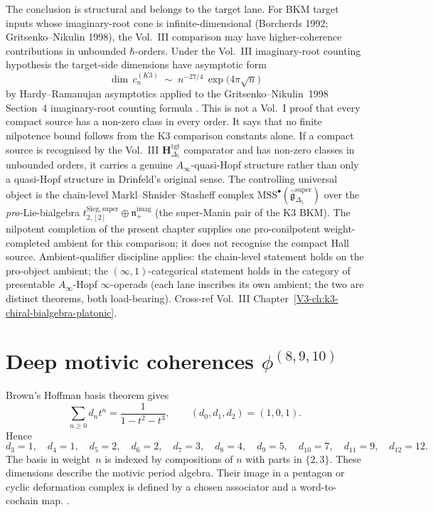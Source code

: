 \begin{remark}
\label{rem:nc-Ainfty-open}
The conclusion is structural and belongs to the target lane.  For BKM
target inputs whose imaginary-root cone is infinite-dimensional
\textup{(}Borcherds 1992; Gritsenko--Nikulin 1998\textup{)}, the
Vol.~III comparison may have higher-coherence contributions in
unbounded $\hbar$-orders.  Under the Vol.~III imaginary-root counting
hypothesis the target-side dimensions have asymptotic form
\[
\dim\,c_n^{(K3)} \;\sim\; n^{-27/4}\,\exp\!\bigl(4\pi\sqrt{n}\bigr)
\]
by Hardy--Ramanujan asymptotics applied to the Gritsenko--Nikulin~1998
Section~4 imaginary-root counting formula
\cite{GritsenkoNikulin1998,Borcherds1992,HardyRamanujan1918}.
This is not a Vol.~I proof that every compact source has a non-zero
class in every order.  It says that no finite nilpotence bound follows
from the K3 comparison constants alone.  If a compact source is
recognised by the Vol.~III
$\mathbf H_{\Delta_5}^{\mathrm{tgt}}$ comparator and has non-zero
classes in unbounded orders, it carries a genuine
$A_\infty$-quasi-Hopf structure rather than only a quasi-Hopf structure
in Drinfeld's original sense.  The
controlling universal object is the chain-level Markl--Shnider--Stasheff
complex $\mathrm{MSS}^\bullet(\widehat{\mathfrak g}^{\mathrm{super}}_{\Delta_5})$
over the \emph{pro-}Lie-bialgebra
$t^{\mathrm{Sieg},\mathrm{super}}_{2,[2]} \oplus \mathfrak n_+^{\mathrm{imag}}$
(the super-Manin pair of the K3 BKM).  The nilpotent completion of the
present chapter supplies one pro-conilpotent weight-completed ambient
for this comparison; it does not recognise the compact Hall source.
Ambient-qualifier
discipline applies: the chain-level statement holds on the
pro-object ambient; the $(\infty,1)$-categorical statement holds in
the category of presentable $A_\infty$-Hopf $\infty$-operads
(each lane inscribes its own ambient; the two are distinct
theorems, both load-bearing). Cross-ref Vol.~III
Chapter~\ref{V3-ch:k3-chiral-bialgebra-platonic}.
\end{remark}

\section{Deep motivic coherences $\phi^{(8,9,10)}$}
\label{sec:nc-supplement-iii}

\begin{remark}
\label{rem:nc-brown-deligne}
Brown's Hoffman basis theorem gives
\[
 \sum_{n\geq0}d_nt^n=\frac{1}{1-t^2-t^3},
 \qquad
 (d_0,d_1,d_2)=(1,0,1).
\]
Hence
\[
d_3=1,\quad d_4=1,\quad d_5=2,\quad d_6=2,\quad
d_7=3,\quad d_8=4,\quad d_9=5,\quad d_{10}=7,\quad
d_{11}=9,\quad d_{12}=12.
\]
The basis in weight~\(n\) is indexed by compositions of \(n\) with
parts in \(\{2,3\}\).  These dimensions describe the motivic period
algebra.  Their image in a pentagon or cyclic deformation complex is
defined by a chosen associator and a word-to-cochain map.
\cite{Brown2011,Hoffman1997}.
\end{remark}

